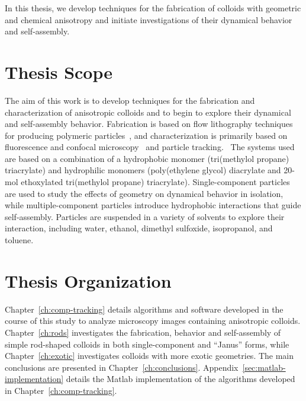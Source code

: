 In this thesis, we develop techniques for
the fabrication of colloids with geometric and chemical anisotropy and 
initiate investigations of their dynamical behavior
and self-assembly.

\section{Thesis Scope}

The aim of this work is to develop techniques for the fabrication and characterization of anisotropic colloids and to begin
to explore their dynamical and self-assembly behavior.  Fabrication is based on flow lithography
techniques for producing polymeric particles~\cite{dendukuri-cfl, dendukuri-sfl}, 
and characterization is primarily based on fluorescence and confocal 
microscopy~\cite{weitz-confocal} and particle 
tracking.~\cite{crocker-grier-spheres,rods-mohraz}
The systems used are based on a combination of a hydrophobic monomer (tri(methylol propane) triacrylate) and hydrophilic 
monomers (poly(ethylene glycol) diacrylate and 20-mol ethoxylated tri(methylol propane) triacrylate). 
Single-component particles are used to study the effects of
geometry on dynamical behavior in isolation, while multiple-component particles introduce 
hydrophobic interactions that guide self-assembly.  Particles are suspended in a 
variety of solvents to explore their interaction, including
water, ethanol, dimethyl sulfoxide, isopropanol, and toluene.

\section{Thesis Organization}

Chapter~\ref{ch:comp-tracking}
details algorithms and software developed in the course of this study to analyze microscopy images containing 
anisotropic colloids.  Chapter~\ref{ch:rods} investigates the fabrication, behavior and self-assembly of simple rod-shaped colloids
in both single-component and ``Janus'' forms, while Chapter~\ref{ch:exotic} 
investigates colloids with more exotic geometries. The main
conclusions are presented in Chapter~\ref{ch:conclusions}.  
Appendix~\ref{sec:matlab-implementation} details the Matlab implementation of the algorithms developed in
Chapter~\ref{ch:comp-tracking}.
